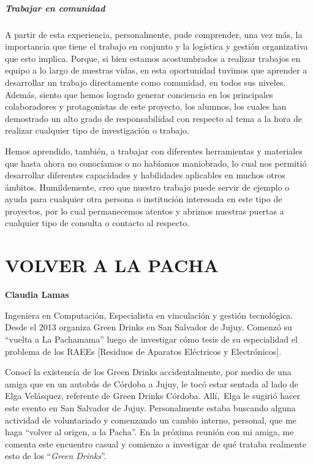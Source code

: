 \documentclass[
]{article}
\begin{document}
\hypertarget{trabajar-en-comunidad}{%
\subparagraph{Trabajar en comunidad}\label{trabajar-en-comunidad}}

A partir de esta experiencia, personalmente, pude comprender, una vez
más, la importancia que tiene el trabajo en conjunto y la logística y
gestión organizativa que esto implica. Porque, si bien estamos
acostumbrados a realizar trabajos en equipo a lo largo de nuestras
vidas, en esta oportunidad tuvimos que aprender a desarrollar un trabajo
directamente como comunidad, en todos sus niveles. Además, siento que
hemos logrado generar conciencia en los principales colaboradores y
protagonistas de este proyecto, los alumnos, los cuales han demostrado
un alto grado de responsabilidad con respecto al tema a la hora de
realizar cualquier tipo de investigación o trabajo.

Hemos aprendido, también, a trabajar con diferentes herramientas y
materiales que hasta ahora no conocíamos o no habíamos maniobrado, lo
cual nos permitió desarrollar diferentes capacidades y habilidades
aplicables en muchos otros ámbitos. Humildemente, creo que nuestro
trabajo puede servir de ejemplo o ayuda para cualquier otra persona o
institución interesada en este tipo de proyectos, por lo cual
permanecemos atentos y abrimos nuestras puertas a cualquier tipo de
consulta o contacto al respecto.

\cleardoublepage

\hypertarget{volver-a-la-pacha}{%
\section{VOLVER A LA PACHA}\label{volver-a-la-pacha}}

\textbf{Claudia Lamas}

Ingeniera en Computación, Especialista en vinculación y gestión
tecnológica. Desde el 2013 organiza Green Drinks en San Salvador de
Jujuy. Comenzó su ``vuelta a La Pachamama'' luego de investigar cómo
tesis de su especialidad el problema de los RAEEs {[}Residuos de
Aparatos Eléctricos y Electrónicos{]}.

Conocí la existencia de los Green Drinks accidentalmente, por medio de
una amiga que en un autobús de Córdoba a Jujuy, le tocó estar sentada al
lado de Elga Velásquez, referente de Green Drinks Córdoba. Allí,~Elga le
sugirió hacer este evento en San Salvador de Jujuy. Personalmente estaba
buscando alguna actividad de voluntariado y comenzando un cambio
interno, personal, que me haga ``volver al origen, a la Pacha''. En la
próxima reunión con mi amiga, me comenta este encuentro casual y
comienzo a investigar de qué trataba realmente esto de los ``\emph{Green
Drinks}''.
\end{document}
